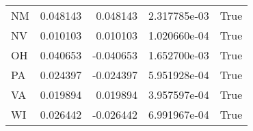 \begin{table}
\begin{tabular}{lrrrl}
      NM &   0.048143 &  0.048143 &   2.317785e-03 &          True \\
      NV &   0.010103 &  0.010103 &   1.020660e-04 &          True \\
      OH &   0.040653 & -0.040653 &   1.652700e-03 &          True \\
      PA &   0.024397 & -0.024397 &   5.951928e-04 &          True \\
      VA &   0.019894 &  0.019894 &   3.957597e-04 &          True \\
      WI &   0.026442 & -0.026442 &   6.991967e-04 &          True \\
\bottomrule
\end{tabular}
\end{table}
